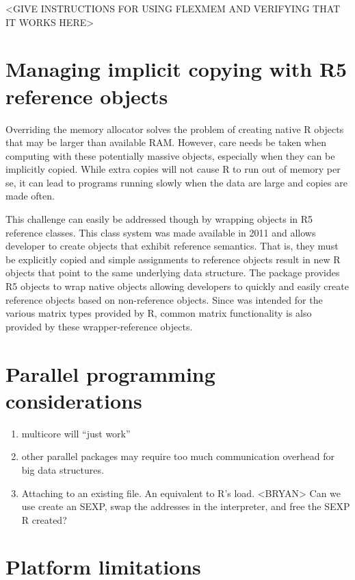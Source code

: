 <GIVE INSTRUCTIONS FOR USING FLEXMEM AND VERIFYING THAT IT WORKS HERE>

\section{Managing implicit copying with R5 reference objects}

Overriding the memory allocator solves the problem of creating native
R objects that may be larger than available RAM. However, care needs
be taken when computing with these potentially massive objects, 
especially when they can be implicitly copied. While extra copies will
not cause R to run out of memory per se, it can lead to programs running
slowly when the data are large and copies are made often.

This challenge can easily be addressed though by wrapping objects in 
R5 reference classes. This class system was made available in 2011 and
allows developer to create objects that exhibit reference semantics.
That is, they must be explicitly copied and simple assignments to 
reference objects result in new R objects that point to the same 
underlying data structure. The  package provides R5 objects 
to wrap native objects allowing developers to quickly and easily create
reference objects based on non-reference objects. Since  
was intended for the various matrix types provided by R, common matrix
functionality is also provided by these wrapper-reference objects.

\section{Parallel programming considerations}

\begin{enumerate}
\item multicore will ``just work''
\item other parallel packages may require too much communication overhead
for big data structures.
\item Attaching to an existing file. An equivalent to R's load.
<BRYAN> Can we use create an SEXP, swap the addresses in the interpreter,
and free the SEXP R created?
\end{enumerate}

\section{Platform limitations}


